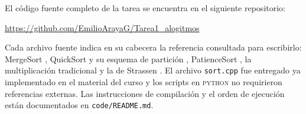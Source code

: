 El código fuente completo de la tarea se encuentra en el siguiente repositorio:

\begin{center}
\url{https://github.com/EmilioArayaG/Tarea1_alogitmos}
\end{center}

Cada archivo fuente indica en su cabecera la referencia consultada para escribirlo:
MergeSort \cite{gfg_mergesort}, QuickSort y su esquema de partición
\cite{gfg_quicksort,gfg_hoare_lomuto}, PatienceSort \cite{princeton_patience,gfg_lis}, la
multiplicación tradicional \cite{gfg_naive} y la de Strassen \cite{gfg_strassen}. El
archivo \texttt{sort.cpp} fue entregado ya implementado en el material del curso
\cite{cppref_sort} y los scripts en \textsc{python} no requirieron referencias externas.
Las instrucciones de compilación y el orden de ejecución están documentados en
\texttt{code/README.md}.
